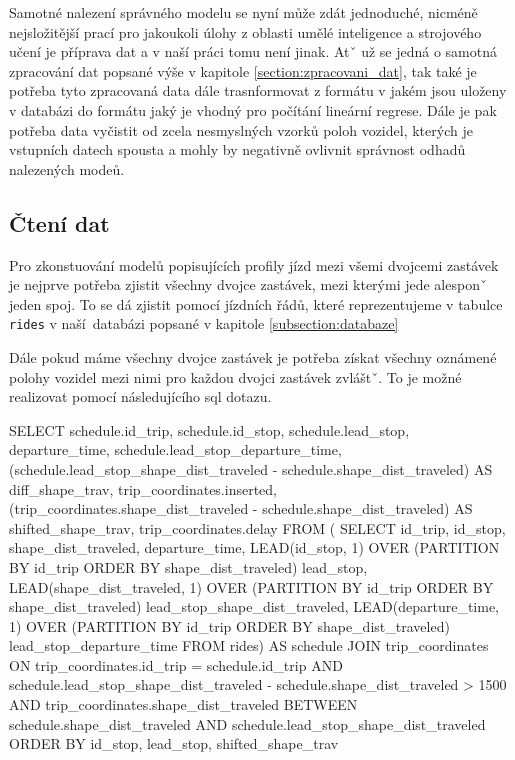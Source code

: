 Samotné nalezení správného modelu se nyní může zdát jednoduché, nicméně nejsložitější prací pro jakoukoli úlohy z oblasti umělé inteligence a strojového učení je příprava dat a v naší práci tomu není jinak. Atˇ už se jedná o samotná zpracování dat popsané výše v kapitole \ref{section:zpracovani_dat}, tak také je potřeba tyto zpracovaná data dále trasnformovat z formátu v jakém jsou uloženy v databázi do formátu jaký je vhodný pro počítání lineární regrese. Dále je pak potřeba data vyčistit od zcela nesmyslných vzorků poloh vozidel, kterých je vstupních datech spousta a mohly by negativně ovlivnit správnost odhadů nalezených modeů.

\subsection{Čtení dat} \label{subsection:cteni_dat}

Pro zkonstuování modelů popisujících profily jízd mezi všemi dvojcemi zastávek je nejprve potřeba zjistit všechny dvojce zastávek, mezi kterými jede alesponˇ jeden spoj. To se dá zjistit pomocí jízdních řádů, které reprezentujeme v tabulce \verb-rides- v naší databázi popsané v kapitole \ref{subsection:databaze}

\bigbreak

 Dále pokud máme všechny dvojce zastávek je potřeba získat všechny oznámené polohy vozidel mezi nimi pro každou dvojci zastávek zvláštˇ. To je možné realizovat pomocí následujícího \gls{sql} dotazu.

\begin{code}[frame=none]
SELECT schedule.id_trip,
  schedule.id_stop,
  schedule.lead_stop,
  departure_time,
  schedule.lead_stop_departure_time,
  (schedule.lead_stop_shape_dist_traveled - schedule.shape_dist_traveled)
    AS diff_shape_trav,
  trip_coordinates.inserted,
  (trip_coordinates.shape_dist_traveled - schedule.shape_dist_traveled)
    AS shifted_shape_trav,
  trip_coordinates.delay
FROM (
  SELECT id_trip, id_stop, shape_dist_traveled, departure_time,
    LEAD(id_stop, 1) OVER (PARTITION BY
	  id_trip ORDER BY shape_dist_traveled) lead_stop,
    LEAD(shape_dist_traveled, 1) OVER (PARTITION BY
	  id_trip ORDER BY shape_dist_traveled) lead_stop_shape_dist_traveled,
    LEAD(departure_time, 1) OVER (PARTITION BY
	  id_trip ORDER BY shape_dist_traveled) lead_stop_departure_time
  FROM rides) AS schedule
JOIN trip_coordinates
ON trip_coordinates.id_trip = schedule.id_trip AND
  schedule.lead_stop_shape_dist_traveled -
    schedule.shape_dist_traveled > 1500 AND
  trip_coordinates.shape_dist_traveled
    BETWEEN schedule.shape_dist_traveled AND
  schedule.lead_stop_shape_dist_traveled
ORDER BY id_stop, lead_stop, shifted_shape_trav
\end{code}

